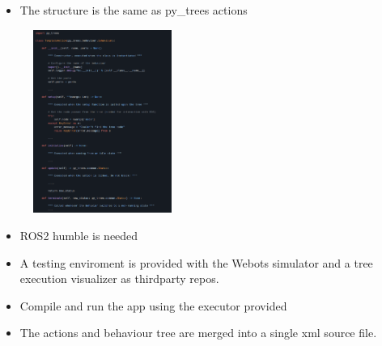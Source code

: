 \documentclass[notes,slidesec,a4]{seminar}
\begin{document}
\begin{hslide}
\newpage
  \begin{itemize}
  \item The structure is the same as py\_trees actions
  \end{itemize}
 \begin{figure}
    \centerline{\includegraphics[height=6cm]{figs/screenshot4.png}}
 \end{figure}
 
 \newpage
 \begin{itemize}
 \item ROS2 humble is needed
 \item A testing enviroment is provided with the Webots simulator and a tree execution visualizer as thirdparty repos.
 \item Compile and run the app using the executor provided
 \item The actions and behaviour tree are merged into a single xml source file.
 \end{itemize}


\end{hslide}
\end{document}
